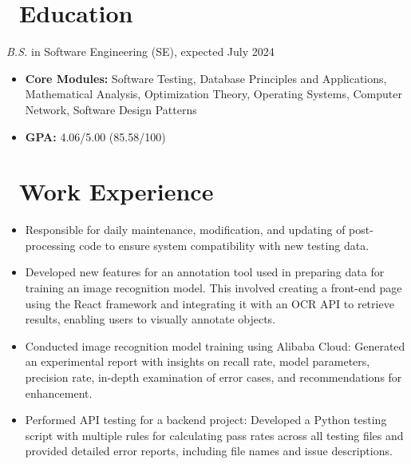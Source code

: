 \documentclass{resume}
\begin{document}



\section{\faGraduationCap\ Education}
\textit{B.S.} in Software Engineering (SE), expected July 2024
\begin{itemize}
  \item \textbf{Core Modules: }Software Testing, Database Principles and Applications, Mathematical Analysis, Optimization Theory, Operating Systems, Computer Network, Software Design Patterns
  \item \textbf{GPA: }4.06/5.00 (85.58/100)
\end{itemize}


\section{\faUsers\ Work Experience}
\role{Backend Developer}{Intern}
\begin{itemize}
  \item Responsible for daily maintenance, modification, and updating of post-processing code to ensure system compatibility with new testing data.
  \item Developed new features for an annotation tool used in preparing data for training an image recognition model. This involved creating a front-end page using the React framework and integrating it with an OCR API to retrieve results, enabling users to visually annotate objects.
  \item Conducted image recognition model training using Alibaba Cloud: Generated an experimental report with insights on recall rate, model parameters, precision rate, in-depth examination of error cases, and recommendations for enhancement.
  \item Performed API testing for a backend project: Developed a Python testing script with multiple rules for calculating pass rates across all testing files and provided detailed error reports, including file names and issue descriptions.
\end{itemize}
\end{document}
